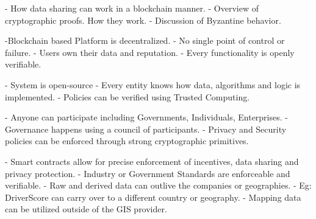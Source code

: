- How data sharing can work in a blockchain manner. 
- Overview of cryptographic proofs. How they work.
- Discussion of Byzantine behavior.

-Blockchain based Platform is decentralized.
    - No single point of control or failure.
    - Users own their data and reputation.
    - Every functionality is openly verifiable.

- System is open-source
 - Every entity knows how data, algorithms and logic is implemented.
 - Policies can be verified using Trusted Computing.

- Anyone can participate including Governments, Individuals, Enterprises.
- Governance happens using a council of participants.
- Privacy and Security policies can be enforced through strong cryptographic primitives.


- Smart contracts allow for precise enforcement of incentives, data sharing and privacy protection.
- Industry or Government Standards are enforceable and verifiable.
- Raw and derived data can outlive the companies or geographies.
- Eg: DriverScore can carry over to a different country or geography.
- Mapping data can be utilized outside of the GIS provider.


